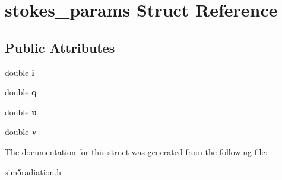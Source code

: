 \hypertarget{structstokes__params}{}\section{stokes\+\_\+params Struct Reference}
\label{structstokes__params}
\subsection*{Public Attributes}
\begin{DoxyCompactItemize}
\item 
\mbox{\label{structstokes__params_a4b70d10e440e13941abc579cac4ee59b}} 
double {\bfseries i}
\item 
\mbox{\label{structstokes__params_a324caab29550ed5a60ab6fa9cfcf9317}} 
double {\bfseries q}
\item 
\mbox{\label{structstokes__params_aa58dadc62942cc98c6e8ed5bfa89b06a}} 
double {\bfseries u}
\item 
\mbox{\label{structstokes__params_a46db78c83a0fb2891b053f5558754798}} 
double {\bfseries v}
\end{DoxyCompactItemize}


The documentation for this struct was generated from the following file\+:\begin{DoxyCompactItemize}
\item 
sim5radiation.\+h\end{DoxyCompactItemize}
